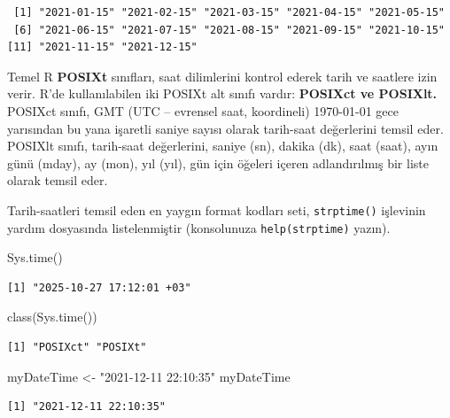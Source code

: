 \documentclass[
  letterpaper,
  DIV=11,
  numbers=noendperiod]{scrreprt}
\newenvironment{Shaded}{\begin{snugshade}}{\end{snugshade}}
\newcommand{\FunctionTok}[1]{\textcolor[rgb]{0.28,0.35,0.67}{#1}}
\newcommand{\NormalTok}[1]{\textcolor[rgb]{0.00,0.23,0.31}{#1}}
\newcommand{\OtherTok}[1]{\textcolor[rgb]{0.00,0.23,0.31}{#1}}
\newcommand{\StringTok}[1]{\textcolor[rgb]{0.13,0.47,0.30}{#1}}
\begin{document}
\begin{verbatim}
 [1] "2021-01-15" "2021-02-15" "2021-03-15" "2021-04-15" "2021-05-15"
 [6] "2021-06-15" "2021-07-15" "2021-08-15" "2021-09-15" "2021-10-15"
[11] "2021-11-15" "2021-12-15"
\end{verbatim}

Temel R \textbf{POSIXt} sınıfları, saat dilimlerini kontrol ederek tarih
ve saatlere izin verir. R'de kullanılabilen iki POSIXt alt sınıfı
vardır: \textbf{POSIXct ve POSIXlt.} POSIXct sınıfı, GMT (UTC --
evrensel saat, koordineli) 1970-01-01 gece yarısından bu yana işaretli
saniye sayısı olarak tarih-saat değerlerini temsil eder. POSIXlt sınıfı,
tarih-saat değerlerini, saniye (sn), dakika (dk), saat (saat), ayın günü
(mday), ay (mon), yıl (yıl), gün için öğeleri içeren adlandırılmış bir
liste olarak temsil eder.

Tarih-saatleri temsil eden en yaygın format kodları seti,
\texttt{strptime()} işlevinin yardım dosyasında listelenmiştir
(konsolunuza \texttt{help(strptime)} yazın).

\begin{Shaded}
\begin{Highlighting}[]
\FunctionTok{Sys.time}\NormalTok{()}
\end{Highlighting}
\end{Shaded}

\begin{verbatim}
[1] "2025-10-27 17:12:01 +03"
\end{verbatim}

\begin{Shaded}
\begin{Highlighting}[]
\FunctionTok{class}\NormalTok{(}\FunctionTok{Sys.time}\NormalTok{())}
\end{Highlighting}
\end{Shaded}

\begin{verbatim}
[1] "POSIXct" "POSIXt" 
\end{verbatim}

\begin{Shaded}
\begin{Highlighting}[]
\NormalTok{myDateTime }\OtherTok{\textless{}{-}} \StringTok{"2021{-}12{-}11 22:10:35"}
\NormalTok{myDateTime}
\end{Highlighting}
\end{Shaded}

\begin{verbatim}
[1] "2021-12-11 22:10:35"
\end{verbatim}
\end{document}
